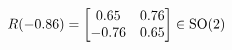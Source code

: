 \documentclass[preview]{standalone}
\begin{document}
\begin{align*}
\special{dvisvgm:raw <g id='unique000'>}R(-0.86) = \begin{bmatrix} 0.65 & 0.76 \\ -0.76 & 0.65 \end{bmatrix} \in \text{SO}(2)\special{dvisvgm:raw </g>}
\end{align*}
\end{document}

